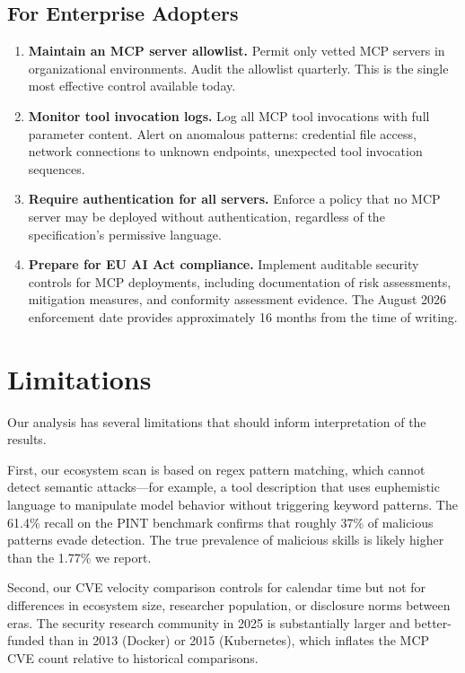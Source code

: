 \documentclass[11pt,twocolumn]{article}
\begin{document}
\subsection{For Enterprise Adopters}

\begin{enumerate}[leftmargin=*]
    \item \textbf{Maintain an MCP server allowlist.} Permit only vetted MCP servers in organizational environments. Audit the allowlist quarterly. This is the single most effective control available today.
    \item \textbf{Monitor tool invocation logs.} Log all MCP tool invocations with full parameter content. Alert on anomalous patterns: credential file access, network connections to unknown endpoints, unexpected tool invocation sequences.
    \item \textbf{Require authentication for all servers.} Enforce a policy that no MCP server may be deployed without authentication, regardless of the specification's permissive language.
    \item \textbf{Prepare for EU AI Act compliance.} Implement auditable security controls for MCP deployments, including documentation of risk assessments, mitigation measures, and conformity assessment evidence. The August 2026 enforcement date provides approximately 16 months from the time of writing.
\end{enumerate}

\section{Limitations}
\label{sec:limitations}

Our analysis has several limitations that should inform interpretation of the results.

First, our ecosystem scan is based on regex pattern matching, which cannot detect semantic attacks---for example, a tool description that uses euphemistic language to manipulate model behavior without triggering keyword patterns. The 61.4\% recall on the PINT benchmark confirms that roughly 37\% of malicious patterns evade detection. The true prevalence of malicious skills is likely higher than the 1.77\% we report.

Second, our CVE velocity comparison controls for calendar time but not for differences in ecosystem size, researcher population, or disclosure norms between eras. The security research community in 2025 is substantially larger and better-funded than in 2013 (Docker) or 2015 (Kubernetes), which inflates the MCP CVE count relative to historical comparisons.
\end{document}
